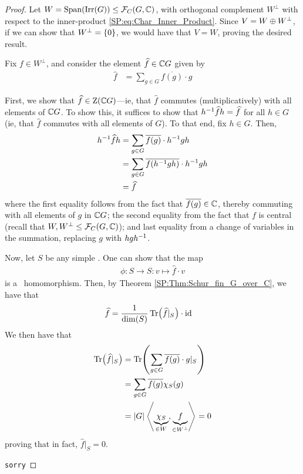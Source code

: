 \begin{proof}
    Let $W = \operatorname{Span}\!\left( \operatorname{Irr}\!\left( G \right) \right) \leq \mathcal{F}_C\!\left( G, \mathbb{C} \right)$, with orthogonal complement $W^\perp$ with respect to the inner-product \ref{SP:eq:Char_Inner_Product}. Since $V = W \oplus W^\perp$, if we can show that $W^\perp = \left\{ 0 \right\}$, we would have that $V = W$, proving the desired result.

    Fix $f \in W^\perp$, and consider the element $\widehat{f} \in \mathbb{C} G$ given by  %
    \begin{align*}
        \hat{f} &= \sum_{g \in G} \overline{f(g)} \cdot g
    \end{align*}

    First, we show that $\widehat{f} \in \operatorname{Z}\!\left( \mathbb{C} G \right)$---ie, that $\hat{f}$ commutes (multiplicatively) with all elements of $\mathbb{C} G$. To show this, it suffices to show that $h^{-1} \widehat{f} h = \widehat{f}$ for all $h \in G$ (ie, that $\hat{f}$ commutes with all elements of $G$). To that end, fix $h \in G$. Then,
    \begin{align*}
        h\inv \hat{f} h &=
        \sum_{g \in G} \overline{f(g)} \cdot h\inv g h \\
        &= \sum_{g \in G} \overline{\fof{h\inv g h}} \cdot h\inv g h \\ %
        &= \hat{f}
    \end{align*}
    where the first equality follows from the fact that $\overline{f(g)} \in \mathbb{C}$, thereby commuting with all elements of $g$ in $\mathbb{C} G$; the second equality from the fact that $f$ is central (recall that $W, W^{\perp} \leq \mathcal{F}_C\!\left( G, \mathbb{C} \right)$); and last equality from a change of variables in the summation, replacing $g$ with $hgh^{-1}$.

    Now, let $S$ be any simple \CGM. One can show that the map  %
    \begin{align*}
        \phi : S \to S : v \mapsto \hat{f} \cdot v
    \end{align*}
    is a \CGM\ homomorphism. %
    Then, by Theorem \ref{SP:Thm:Schur_fin_G_over_C}, we have that
    \begin{align*}
        \widehat{f} &= \frac{1}{\dim\!\left( S \right)} \operatorname{Tr}\!\left( \widehat{f}\vert_S \right) \cdot \operatorname{id}
    \end{align*}
    We then have that
    \begin{align*}
        \operatorname{Tr}\!\left( \widehat{f}\vert_S \right) &= \operatorname{Tr}\!\left( \sum_{g \in G} \overline{f(g)} \cdot g\vert_{S} \right) \\
        &= \sum_{g \in G} \overline{f(g)} \chi_S(g) \\
        &= \left\lvert G \right\rvert \left\langle \underbrace{\chi_S}_{\in W}, \underbrace{f}_{\in W^\perp} \right\rangle = 0
    \end{align*}
    proving that in fact, $\hat{f}\vert_S = 0$.
    
    \verb|sorry| %
\end{proof}